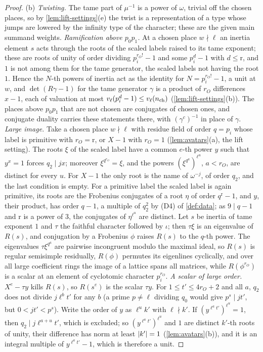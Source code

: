 \begin{proof}
(b) \emph{Twisting.} The tame part of $\mu^{-1}$ is a power of $\omega$, trivial off the chosen places, so by \cref{lem:lift-settings}(e) the twist is a representation of a type whose jumps are lowered by the infinity type of the character;
these are the given main summand weights. \emph{Ramification above $p_0p_1$.} At a chosen place $w\nmid\ell$ an inertia element $s$ acts through the roots of the scaled labels raised to its tame exponent; these are roots of unity
of order dividing $p_i^{r_O!}-1$ and some $p_i^d-1$ with $d\le\mathrm r$, and $1$ is not among them for the tame generator, the scaled labels not having the root $1$. Hence the $N$-th powers of inertia act as the identity for
$N=p_i^{r_O!}-1$, a unit at $w$, and $\det(R\gamma-1)$ for the tame generator $\gamma$ is a product of $r_O$ differences $x-1$, each of valuation at most $v_\ell(p_i^d-1)\le v_\ell(n_{\rm ch})$ (\cref{lem:lift-settings}(b)). The places above
$p_0p_1$ that are not chosen are conjugates of chosen ones, and conjugate duality carries these statements there, with $(\gamma^c)^{-1}$ in place of $\gamma$. \emph{Large image.} Take a chosen place $w\nmid\ell$ with residue field of
order $q=p_i$ whose label is primitive with $r_O=\mathrm r$, or $X-1$ with $r_O=1$ (\cref{lem:avatars}(a), the lift setting). The roots $\xi$ of the scaled label have a common $e$-th power $y$ such that $y^x=1$ forces $q_2\mid jx$;
moreover $\xi^{q^{r_O}}=\xi$, and the powers $(\xi^{q^a})^{\ell^u}$, $a<r_O$, are distinct for every $u$. For $X-1$ the only root is the name of $\omega^{-j}$, of order $q_2$, and the last condition is empty. For a primitive label the
scaled label is again primitive, its roots are the Frobenius conjugates of a root $\eta$ of order $q^{\mathrm r}-1$, and $y$, their product, has order $q-1$, a multiple of $q_2^2$ by (D4) of \cref{def:data}; as $9\mid q-1$ and $\mathrm r$ is a
power of $3$, the conjugates of $\eta^{\ell^u}$ are distinct. Let $s$ be inertia of
tame exponent $1$ and $\tau$ the faithful character followed by $\iota$; then $\tau\xi$ is an eigenvalue of $R(s)$, and conjugation by a Frobenius $\phi$ raises $R(s)$ to the $q$-th power. The eigenvalues
$\tau\xi^{q^a}$ are pairwise incongruent modulo the maximal ideal, so $R(s)$ is regular semisimple residually, $R(\phi)$ permutes its eigenlines cyclically, and over all large coefficient rings the image of a lattice
spans all matrices, while $R(\phi^{r_O})$ is a scalar at an element of cyclotomic character $p_i^{r_O}$. \emph{A scalar of large order.} $X^e-\tau y$ kills $R(s)$, so $R(s^e)$ is the scalar $\tau y$. For $1\le t'\le4r_O+2$ and all $a$,
$q_2$ does not divide $j\ell^bt'$ for any $b$ (a prime $p\ne\ell$ dividing $q_0$ would give $p^s\mid jt'$, but $0<jt'<p^s$). Write the order of $y$ as $\ell^uk'$ with $\ell\nmid k'$. If $(y^{\ell^at'})^{\ell^u}=1$, then $q_2\mid j\ell^{a+u}t'$,
which is excluded; so $(y^{\ell^at'})^{\ell^u}$ and $1$ are distinct $k'$-th roots of unity, their difference has norm at least $\lvert k'\rvert=1$ (\cref{lem:avatars}(b)), and it is an integral multiple of $y^{\ell^at'}-1$, which is therefore a
unit.


\end{proof}
